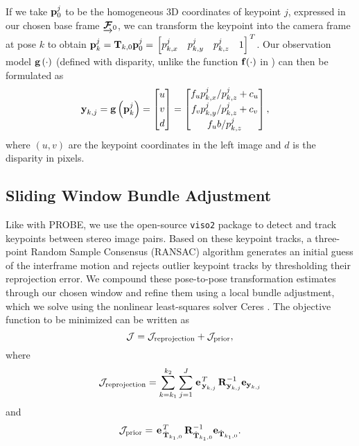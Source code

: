 If we take $\boldsymbol{\mathbf{p}}_0^j$ to be the homogeneous 3D coordinates of keypoint $j$, expressed in our chosen base frame $\underrightarrow{ \boldsymbol{\mathbf{\mathcal{F}}} }_{0}$, we can transform the keypoint into the camera frame at pose $k$ to obtain $\boldsymbol{\mathbf{p}}_k^j = \boldsymbol{\mathbf{T}}_{k,0}\boldsymbol{\mathbf{p}}_0^j = \left.{\begin{bmatrix} p_{k,x}^j & p_{k,y}^j & p_{k,z}^j & 1 \end{bmatrix}}\right.^T$. Our observation model $\boldsymbol{\mathbf{g}}\left(\cdot\right)$ (defined with disparity, unlike the function $\boldsymbol{\mathbf{f}}(\cdot)$ in ) can then be formulated as
\begin{align} \label{eq:cam_model}
    \Vector{y}_{k,j} &= \CameraModel{\Keypoint_k^j}
                    = \bbm u \\ v \T \\ d \T \ebm 
                    = \bbm 
			   		    f_u \KeypointComponent_{k,x}^j / \KeypointComponent_{k,z}^j + c_u \\
			   		    f_v \KeypointComponent_{k,y}^j / \KeypointComponent_{k,z}^j + c_v \T \\
			   		    f_u b / \KeypointComponent_{k,z}^j  \T
			         \ebm,
\end{align}
where $\left(u,v\right)$ are the keypoint coordinates in the left image and $d$ is the disparity in pixels.

\subsection{Sliding Window Bundle Adjustment}
Like with PROBE, we use the open-source \texttt{viso2} package \citep{Geiger2011-xe} to detect and track keypoints between stereo image pairs.
Based on these keypoint tracks, a three-point Random Sample Consensus (RANSAC) algorithm \citep{fischler1981random} generates an initial guess of the interframe motion and rejects outlier keypoint tracks by thresholding their reprojection error.
We compound these pose-to-pose transformation estimates through our chosen window and refine them using a local bundle adjustment, which we solve using the nonlinear least-squares solver Ceres \citep{ceres-solver}.
The objective function to be minimized can be written as
\begin{equation} \label{eq:cost_function}
    \mathcal{J} = \mathcal{J}_\text{reprojection} + \mathcal{J}_\text{prior},
\end{equation}
where
\begin{equation} \label{eq:reprojection_cost}
	\mathcal{J}_\text{reprojection} = \sum_{k=k_1}^{k_2} \sum_{j=1}^J \left.{\boldsymbol{\mathbf{e}}}\right.^T_{\boldsymbol{\mathbf{y}}_{k,j}} \boldsymbol{\mathbf{R}}^{-1}_{\boldsymbol{\mathbf{y}}_{k,j}} \boldsymbol{\mathbf{e}}_{\boldsymbol{\mathbf{y}}_{k,j}}
\end{equation}
and 
\begin{equation} \label{eq:prior_cost}
	\mathcal{J}_\text{prior} = \left.{\boldsymbol{\mathbf{e}}}\right.^T_{\hat{\boldsymbol{\mathbf{T}}}_{k_1,0}} \boldsymbol{\mathbf{R}}^{-1}_{\hat{\boldsymbol{\mathbf{T}}}_{k_1,0}} \boldsymbol{\mathbf{e}}_{\hat{\boldsymbol{\mathbf{T}}}_{k_1,0}}.
\end{equation}


